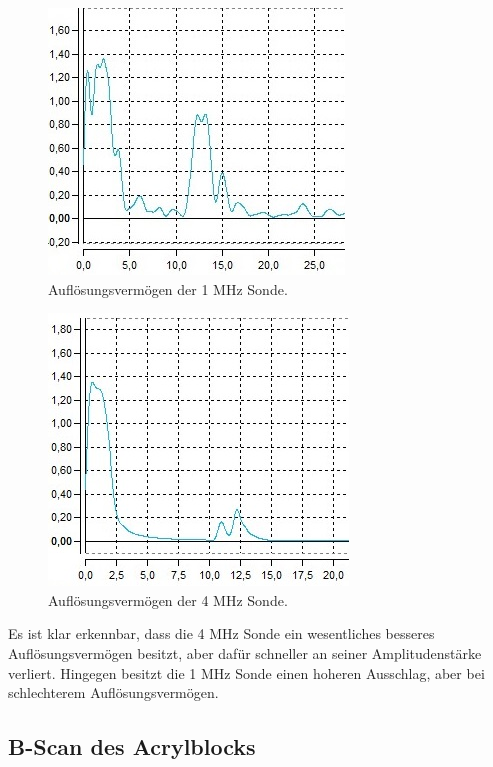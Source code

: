 \begin{figure}
  \centering
  \includegraphics{data/doppel1MHz.jpg}
  \caption{Auflösungsvermögen der 1 MHz Sonde.}
  \label{fig:abbA1}
\end{figure}
\FloatBarrier

\begin{figure}
  \centering
  \includegraphics{data/doppel4MHz.jpg}
  \caption{Auflösungsvermögen der 4 MHz Sonde.}
  \label{fig:abbA2}
\end{figure}
\FloatBarrier

Es ist klar erkennbar, dass die 4 MHz Sonde ein wesentliches besseres Auflösungsvermögen besitzt, aber dafür schneller an seiner Amplitudenstärke verliert.
Hingegen besitzt die 1 MHz Sonde einen hoheren Ausschlag, aber bei schlechterem Auflösungsvermögen.

\subsection{B-Scan des Acrylblocks}
\label{sec:bscan}

